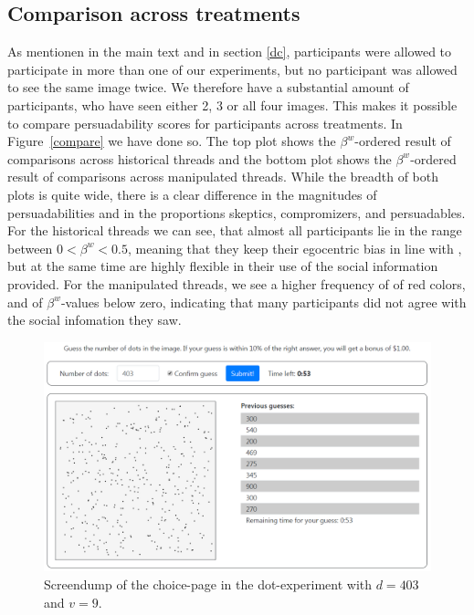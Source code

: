 \documentclass[9pt,a4paper,twocolumn,lineno]{article}
\begin{document}
\subsection*{Comparison across treatments}
As mentionen in the main text and in section \ref{dc}, participants were allowed to participate in more than one of our experiments, but no participant was allowed to see the same image twice. We therefore have a substantial amount of participants, who have seen either 2, 3 or all four images. This makes it possible to compare persuadability scores for participants across treatments. In Figure~\ref{compare} we have done so. The top plot shows the $\beta^w$-ordered result of comparisons across historical threads and the bottom plot shows the $\beta^w$-ordered result of comparisons across manipulated threads. While the breadth of both plots is quite wide, there is a clear difference in the magnitudes of persuadabilities and in the proportions skeptics, compromizers, and persuadables. For the historical threads we can see, that almost all participants lie in the range between $0 < \beta^w < 0.5$, meaning that they keep their egocentric bias in line with \citet{rader2017advice}, but at the same time are highly flexible in their use of the social information provided. For the manipulated threads, we see a higher frequency of  of red colors, and of $\beta^w$-values below zero, indicating that many participants did not agree with the social infomation they saw.  


\begin{figure}
\centering
\includegraphics[width=.8\textwidth]{../Screenshots/FigS1.png}
\caption{Screendump of the choice-page in the dot-experiment with $d=403$ and $v=9$.}
\label{fig:S1}
\end{figure}
\end{document}
